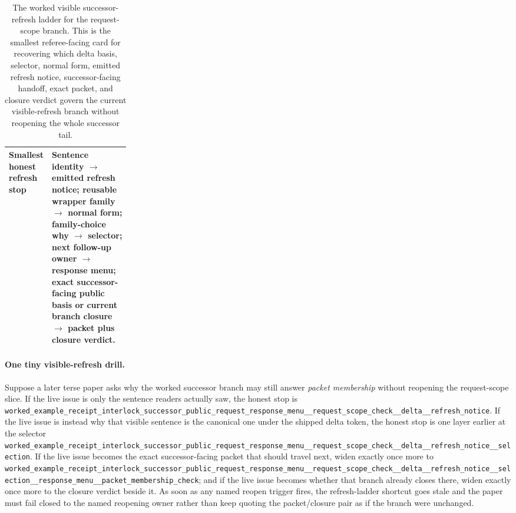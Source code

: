 \documentclass[11pt]{article}
\begin{document}
\begin{table}[t]
\begin{tabularx}{\linewidth}{@{}p{0.24\linewidth}X@{}}
Smallest honest refresh stop & Sentence identity $\to$ emitted refresh notice; reusable wrapper family $\to$ normal form; family-choice why $\to$ selector; next follow-up owner $\to$ response menu; exact successor-facing public basis or current branch closure $\to$ packet plus closure verdict. \\
\bottomrule
\end{tabularx}
\caption{The worked visible successor-refresh ladder for the request-scope branch. This is the smallest referee-facing card for recovering which delta basis, selector, normal form, emitted refresh notice, successor-facing handoff, exact packet, and closure verdict govern the current visible-refresh branch without reopening the whole successor tail.}
\label{tab:workedexample-refresh-ladder-card}
\end{table}

\paragraph{One tiny visible-refresh drill.}
Suppose a later terse paper asks why the worked successor branch may still answer \emph{packet membership} without reopening the request-scope slice.
If the live issue is only the sentence readers actually saw, the honest stop is \nolinkurl{worked_example_receipt_interlock_successor_public_request_response_menu__request_scope_check__delta__refresh_notice}.
If the live issue is instead why that visible sentence is the canonical one under the shipped delta token, the honest stop is one layer earlier at the selector \nolinkurl{worked_example_receipt_interlock_successor_public_request_response_menu__request_scope_check__delta__refresh_notice__selection}.
If the live issue becomes the exact successor-facing packet that should travel next, widen exactly once more to \nolinkurl{worked_example_receipt_interlock_successor_public_request_response_menu__request_scope_check__delta__refresh_notice__selection__response_menu__packet_membership_check}; and if the live issue becomes whether that branch already closes there, widen exactly once more to the closure verdict beside it.
As soon as any named reopen trigger fires, the refresh-ladder shortcut goes stale and the paper must fail closed to the named reopening owner rather than keep quoting the packet/closure pair as if the branch were unchanged.\cite{series:publicrequestresponsepacketrefreshnotices,series:publicrequestresponsepacketrefreshnoticeselections,series:publicrequestresponsepacketrefreshresponsemenus,series:publicrequestresponsepacketrefreshresponsepackets,series:publicrequestresponsepacketrefreshresponsepacketclosureverdicts}
\end{document}
